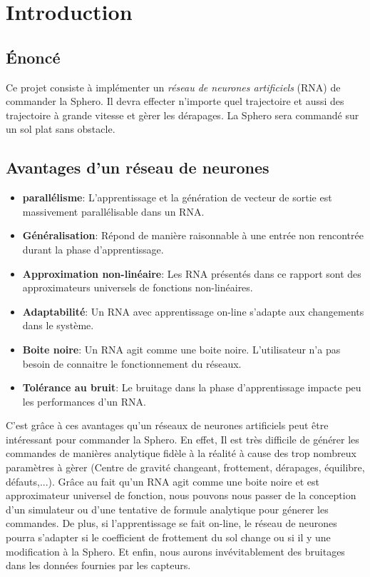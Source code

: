 \documentclass[12pt,a4paper,oneside, titlepage]{article}
\begin{document}


\tableofcontents
\newpage
\section{Introduction}
\subsection*{Énoncé}
Ce projet consiste à implémenter un \emph{réseau de neurones artificiels} \hypertarget{rna}{(RNA)} de commander la Sphero.
Il devra effecter n'importe quel trajectoire et aussi des trajectoire à grande vitesse et gèrer les dérapages.
La Sphero sera commandé sur un sol plat sans obstacle.
\subsection*{Avantages d'un réseau de neurones}
\begin{itemize}
 \item \textbf{parallélisme}: L'apprentissage et la génération de vecteur de sortie est massivement parallélisable dans un RNA.\cite{corelet,Haykin}
 \item \textbf{Généralisation}: Répond de manière raisonnable à une entrée non rencontrée durant la phase d'apprentissage.\cite{statistica,Haykin}
 \item \textbf{Approximation non-linéaire}: Les RNA présentés dans ce rapport sont des approximateurs universels de fonctions non-linéaires.\cite{Haykin}
 \item \textbf{Adaptabilité}: Un RNA avec apprentissage on-line s'adapte aux changements dans le système.\cite{Haykin}
 \item \textbf{Boite noire}: Un RNA agit comme une boite noire. L'utilisateur n'a pas besoin de connaitre le fonctionnement du réseaux.
 \item \textbf{Tolérance au bruit}: Le bruitage dans la phase d'apprentissage impacte peu les performances d'un RNA.\cite{Haykin}
\end{itemize}
C'est grâce à ces avantages qu'un réseaux de neurones artificiels peut être intéressant pour commander la Sphero.
En effet, Il est très difficile de générer les commandes de manières analytique fidèle à la réalité à cause des trop nombreux paramètres à gèrer (Centre de gravité changeant, frottement, dérapages, équilibre, défauts,...).
Grâce au fait qu'un RNA agit comme une boite noire et est approximateur universel de fonction, nous pouvons nous passer de la conception d'un simulateur ou d'une tentative de formule analytique pour génerer les commandes.
De plus, si l'apprentissage se fait on-line, le réseau de neurones pourra s'adapter si le coefficient de frottement du sol change ou si il y une modification à la Sphero.
Et enfin, nous aurons invévitablement des bruitages dans les données fournies par les capteurs.
\end{document}
